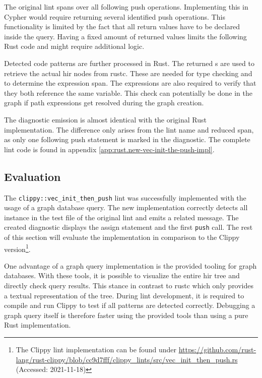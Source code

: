 The original lint spans over all following push operations. Implementing this in Cypher would require returning several identified push operations. This functionality is limited by the fact that all return values have to be declared inside the query. Having a fixed amount of returned values limits the following Rust code and might require additional logic.

Detected code patterns are further processed in Rust. The returned s are used to retrieve the actual \acrshort{hir} nodes from rustc. These are needed for type checking and to determine the expression span. The expressions are also required to verify that they both reference the same variable. This check can potentially be done in the graph if path expressions get resolved during the graph creation.

The diagnostic emission is almost identical with the original Rust implementation. The difference only arises from the lint name and reduced span, as only one following push statement is marked in the diagnostic. The complete lint code is found in appendix \ref{app:rust.new-vec-init-the-push-impl}.

\subsection{Evaluation} \label{sec:prot.eval}

The \texttt{clippy::vec\_init\_then\_push} lint was successfully implemented with the usage of a graph database query. The new implementation correctly detects all instance in the test file of the original lint and emits a related message. The created diagnostic displays the assign statement and the first \texttt{push} call. The rest of this section will evaluate the implementation in comparison to the Clippy version\footnote{The Clippy lint implementation can be found under \url{https://github.com/rust-lang/rust-clippy/blob/cc9d7fff/clippy_lints/src/vec_init_then_push.rs} (Accessed: 2021-11-18)}.

One advantage of a graph query implementation is the provided tooling for graph databases. With these tools, it is possible to visualize the entire \acrshort{hir} tree and directly check query results. This stance in contrast to rustc which only provides a textual representation of the tree. During lint development, it is required to compile and run Clippy to test if all patterns are detected correctly. Debugging a graph query itself is therefore faster using the provided tools than using a pure Rust implementation.

